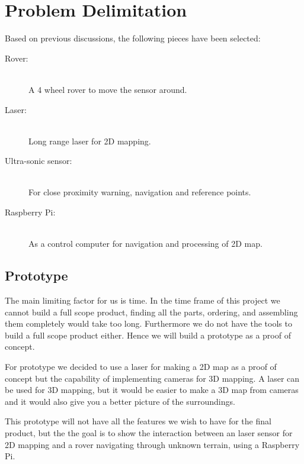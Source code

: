 \section{Problem Delimitation}
Based on previous discussions, the following pieces have been selected:

\begin{description}
  \item[Rover:] \hfill \\
  A 4 wheel rover to move the sensor around.
  \item[Laser:] \hfill \\
  Long range laser for 2D mapping.
  \item[Ultra-sonic sensor:] \hfill \\
  For close proximity warning, navigation and reference points.
  \item[Raspberry Pi:] \hfill \\
  As a control computer for navigation and processing of 2D map.
\end{description}

\subsection{Prototype}
The main limiting factor for us is time. In the time frame of this project we cannot build a full scope product, finding all the parts, ordering, and assembling them completely would take too long. Furthermore we do not have the tools to build a full scope product either. Hence we will build a prototype as a proof of concept.

For prototype we decided to use a laser for making a 2D map as a proof of concept but the capability of implementing cameras for 3D mapping. A laser can be used for 3D mapping, but it would be easier to make a 3D map from cameras and it would also give you a better picture of the surroundings.

This prototype will not have all the features we wish to have for the final product, but the the goal is to show the interaction between an laser sensor for 2D mapping and a rover navigating through unknown terrain, using a Raspberry Pi.

